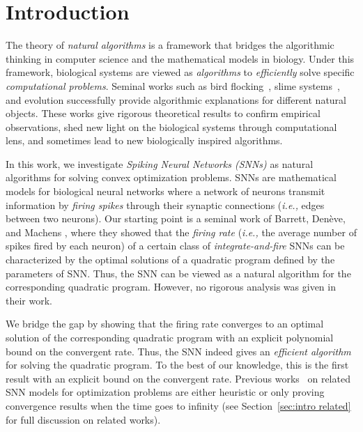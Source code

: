 \documentclass[11pt]{article}
\theoremstyle{remark}
\theoremstyle{definition}
\begin{document}
\section{Introduction}\label{sec:intro}
The theory of \textit{natural algorithms} is a framework that bridges the algorithmic thinking in computer science and the mathematical models in biology. 
Under this framework, biological systems are viewed as \textit{algorithms} to \emph{efficiently} solve specific \textit{computational problems}.
Seminal works such as bird flocking~\cite{chazelle2009natural,chazelle2012natural}, slime systems~\cite{nakagaki2000intelligence, tero2007mathematical, bonifaci2012physarum}, and evolution \cite{livnat2014satisfiability,livnat2016sex} successfully provide algorithmic explanations for different natural objects. These works give rigorous theoretical results to confirm empirical observations, shed new light on the biological systems through computational lens, and sometimes lead to new biologically inspired algorithms.

In this work, we investigate \textit{Spiking Neural Networks (SNNs)} as natural algorithms for solving convex optimization problems. SNNs are mathematical models for biological neural networks where a network of neurons transmit information by \textit{firing spikes} through their synaptic connections (\textit{i.e.,} edges between two neurons).
Our starting point is a seminal work of Barrett, Den\`{e}ve, and Machens \cite{barrett2013firing}, where they showed that the \emph{firing rate} (\textit{i.e.,} the average number of spikes fired by each neuron) of a certain class of \textit{integrate-and-fire} SNNs can be characterized by the optimal solutions of a quadratic program defined by the parameters of SNN. Thus, the SNN can be viewed as a natural algorithm for the corresponding quadratic program. However, no rigorous analysis was given in their work. 

We bridge the gap by showing that the firing rate converges to an optimal solution of the corresponding quadratic program with an explicit polynomial bound on the convergent rate. Thus, the SNN indeed gives an \textit{efficient algorithm} for solving the quadratic program. To the best of our knowledge, this is the first result with an explicit bound on the convergent rate. Previous works~\cite{shapero2013configurable,shapero2014optimal,tang2017sparse} on related SNN models for optimization problems are either heuristic or only proving convergence results when the time goes to infinity (see Section~\ref{sec:intro related} for full discussion on related works).
\end{document}
